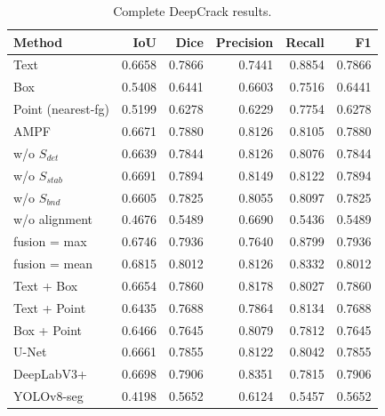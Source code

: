 \begin{table}[ht]
\centering
\caption{Complete DeepCrack results.}
\begin{tabular}{lrrrrr}
\toprule
Method & IoU & Dice & Precision & Recall & F1 \\
\midrule
Text & 0.6658 & 0.7866 & 0.7441 & 0.8854 & 0.7866 \\
Box & 0.5408 & 0.6441 & 0.6603 & 0.7516 & 0.6441 \\
Point (nearest-fg) & 0.5199 & 0.6278 & 0.6229 & 0.7754 & 0.6278 \\
AMPF & 0.6671 & 0.7880 & 0.8126 & 0.8105 & 0.7880 \\
w/o $S_{det}$ & 0.6639 & 0.7844 & 0.8126 & 0.8076 & 0.7844 \\
w/o $S_{stab}$ & 0.6691 & 0.7894 & 0.8149 & 0.8122 & 0.7894 \\
w/o $S_{bnd}$ & 0.6605 & 0.7825 & 0.8055 & 0.8097 & 0.7825 \\
w/o alignment & 0.4676 & 0.5489 & 0.6690 & 0.5436 & 0.5489 \\
fusion = max & 0.6746 & 0.7936 & 0.7640 & 0.8799 & 0.7936 \\
fusion = mean & 0.6815 & 0.8012 & 0.8126 & 0.8332 & 0.8012 \\
Text + Box & 0.6654 & 0.7860 & 0.8178 & 0.8027 & 0.7860 \\
Text + Point & 0.6435 & 0.7688 & 0.7864 & 0.8134 & 0.7688 \\
Box + Point & 0.6466 & 0.7645 & 0.8079 & 0.7812 & 0.7645 \\
U-Net & 0.6661 & 0.7855 & 0.8122 & 0.8042 & 0.7855 \\
DeepLabV3+ & 0.6698 & 0.7906 & 0.8351 & 0.7815 & 0.7906 \\
YOLOv8-seg & 0.4198 & 0.5652 & 0.6124 & 0.5457 & 0.5652 \\
\bottomrule
\end{tabular}
\end{table}
